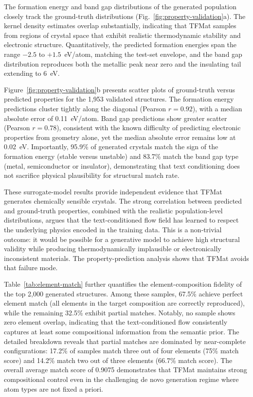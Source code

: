 \documentclass[fleqn,10pt]{wlscirep}
\begin{document}
The formation energy and band gap distributions of the generated population closely track the ground-truth distributions (Fig.~\ref{fig:property-validation}a). The kernel density estimates overlap substantially, indicating that TFMat samples from regions of crystal space that exhibit realistic thermodynamic stability and electronic structure. Quantitatively, the predicted formation energies span the range $-2.5$ to $+1.5$~eV/atom, matching the test-set envelope, and the band gap distribution reproduces both the metallic peak near zero and the insulating tail extending to 6~eV.

Figure~\ref{fig:property-validation}b presents scatter plots of ground-truth versus predicted properties for the 1,953 validated structures. The formation energy predictions cluster tightly along the diagonal (Pearson $r = 0.92$), with a median absolute error of 0.11~eV/atom. Band gap predictions show greater scatter (Pearson $r = 0.78$), consistent with the known difficulty of predicting electronic properties from geometry alone, yet the median absolute error remains low at 0.02~eV. Importantly, 95.9\% of generated crystals match the sign of the formation energy (stable versus unstable) and 83.7\% match the band gap type (metal, semiconductor or insulator), demonstrating that text conditioning does not sacrifice physical plausibility for structural match rate.

These surrogate-model results provide independent evidence that TFMat generates chemically sensible crystals. The strong correlation between predicted and ground-truth properties, combined with the realistic population-level distributions, argues that the text-conditioned flow field has learned to respect the underlying physics encoded in the training data. This is a non-trivial outcome: it would be possible for a generative model to achieve high structural validity while producing thermodynamically implausible or electronically inconsistent materials. The property-prediction analysis shows that TFMat avoids that failure mode.

Table~\ref{tab:element-match} further quantifies the element-composition fidelity of the top 2,000 generated structures. Among these samples, 67.5\% achieve perfect element match (all elements in the target composition are correctly reproduced), while the remaining 32.5\% exhibit partial matches. Notably, no sample shows zero element overlap, indicating that the text-conditioned flow consistently captures at least some compositional information from the semantic prior. The detailed breakdown reveals that partial matches are dominated by near-complete configurations: 17.2\% of samples match three out of four elements (75\% match score) and 14.2\% match two out of three elements (66.7\% match score). The overall average match score of 0.9075 demonstrates that TFMat maintains strong compositional control even in the challenging de novo generation regime where atom types are not fixed a priori.
\end{document}
